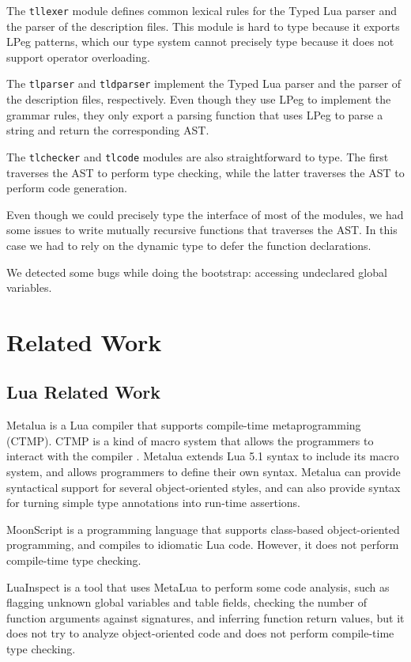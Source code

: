 The \texttt{tllexer} module defines common lexical rules for
the Typed Lua parser and the parser of the description files.
This module is hard to type because it exports LPeg \citep{lpeg,ierusalimschy2009lpeg}
patterns, which our type system cannot precisely type because it does
not support operator overloading.

The \texttt{tlparser} and \texttt{tldparser} implement the Typed Lua
parser and the parser of the description files, respectively.
Even though they use LPeg to implement the grammar rules,
they only export a parsing function that uses LPeg to parse a
string and return the corresponding AST.

The \texttt{tlchecker} and \texttt{tlcode} modules are also
straightforward to type.
The first traverses the AST to perform type checking,
while the latter traverses the AST to perform code generation.

Even though we could precisely type the interface of most of
the modules, we had some issues to write mutually recursive
functions that traverses the AST.
In this case we had to rely on the dynamic type to defer the
function declarations.

We detected some bugs while doing the bootstrap:
accessing undeclared global variables.

\section{Related Work}
\label{sec:relatedwork}

\subsection{Lua Related Work}

Metalua \citep{metalua} is a Lua compiler that supports compile-time
metaprogramming (CTMP).
CTMP is a kind of macro system that allows the programmers to interact
with the compiler \citep{fleutot2007contrasting}. 
Metalua extends Lua 5.1 syntax to include its macro system,
and allows programmers to define their own syntax.
Metalua can provide syntactical support for several object-oriented
styles, and can also provide syntax for turning simple type
annotations into run-time assertions.

MoonScript \citep{moonscript} is a programming language that supports
class-based object-oriented programming, and compiles to idiomatic
Lua code.
However, it does not perform compile-time type checking.

LuaInspect \citep{luainspect} is a tool that uses MetaLua to perform
some code analysis, such as flagging unknown global variables and
table fields, checking the number of function arguments against
signatures, and inferring function return values, but it does not
try to analyze object-oriented code and does not perform compile-time
type checking.

